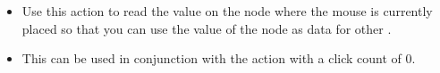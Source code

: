 
\begin{itemize}
\item Use this action to read the value on the node where the mouse is currently placed so that you can use the value of the node as data for other \gdsteps{}.
 \item This can be used in conjunction with the action   with a click count of 0.  
\end{itemize}
